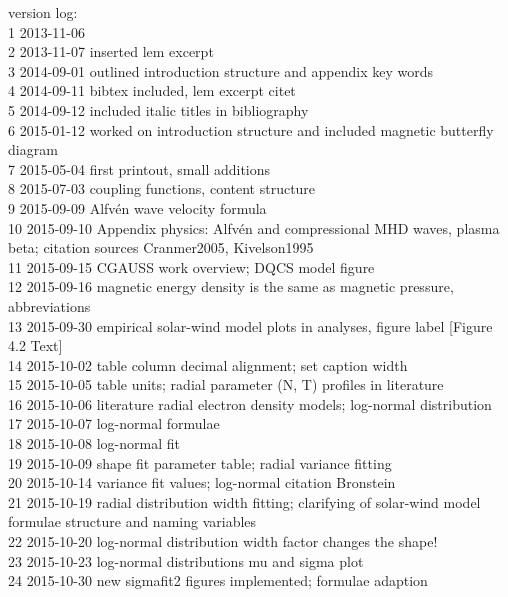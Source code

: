 \begin{footnotesize}
\noindent version log:\\
1	2013-11-06\\
2	2013-11-07	inserted lem excerpt\\
3	2014-09-01	outlined introduction structure and appendix key words\\
4	2014-09-11	bibtex included, lem excerpt citet\\
5	2014-09-12	included italic titles in bibliography\\
6	2015-01-12	worked on introduction structure and included magnetic butterfly diagram\\
7	2015-05-04	first printout, small additions\\
8	2015-07-03	coupling functions, content structure\\
9	2015-09-09	Alfv\'en wave velocity formula\\
10	2015-09-10	Appendix physics: Alfv\'en and compressional MHD waves, plasma beta; citation sources Cranmer2005, Kivelson1995\\
11	2015-09-15	CGAUSS work overview; DQCS model figure\\
12	2015-09-16	magnetic energy density is the same as magnetic pressure, abbreviations\\
13	2015-09-30	empirical solar-wind model plots in analyses, figure label [Figure 4.2  Text]\\
14	2015-10-02	table column decimal alignment; set caption width\\
15	2015-10-05	table units; radial parameter (N, T) profiles in literature\\
16	2015-10-06	literature radial electron density models; log-normal distribution\\
17	2015-10-07	log-normal formulae\\
18	2015-10-08	log-normal fit\\
19	2015-10-09	shape fit parameter table; radial variance fitting\\
20	2015-10-14	variance fit values; log-normal citation Bronstein\\
21	2015-10-19	radial distribution width fitting; clarifying of solar-wind model formulae structure and naming variables\\
22	2015-10-20	log-normal distribution width factor changes the shape!\\
23	2015-10-23	log-normal distributions mu and sigma plot\\
24	2015-10-30	new sigmafit2 figures implemented; formulae adaption\\

\end{footnotesize}
